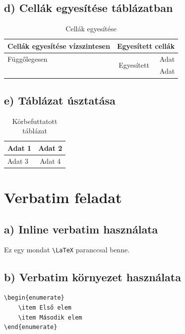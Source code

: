 \documentclass[a4paper,12pt]{article}
\begin{document}
\subsection{d) Cellák egyesítése táblázatban}
\begin{table}[h]
    \centering
    \begin{tabular}{|l|c|r|}
        \hline
        Cellák egyesítése vízszintesen & \multicolumn{2}{|c|}{Egyesített cellák} \\ \hline
        Függőlegesen & \multirow{2}{*}{Egyesített} & Adat \\ \cline{3-3}
        & & Adat \\ \hline
    \end{tabular}
    \caption{Cellák egyesítése}
    \label{tab:merged}
\end{table}

\subsection{e) Táblázat úsztatása}
\begin{table}
    \centering
    \begin{tabular}{|l|c|}
        \hline
        Adat 1 & Adat 2 \\ \hline
        Adat 3 & Adat 4 \\ \hline
    \end{tabular}
    \caption{Körbefuttatott táblázat}
\end{table}

\newpage

\section{Verbatim feladat}

\subsection{a) Inline verbatim használata}
Ez egy mondat \verb|\LaTeX| paranccsal benne.

\subsection{b) Verbatim környezet használata}
\begin{verbatim}
\begin{enumerate}
    \item Első elem
    \item Második elem
\end{enumerate}
\end{verbatim}
\end{document}
